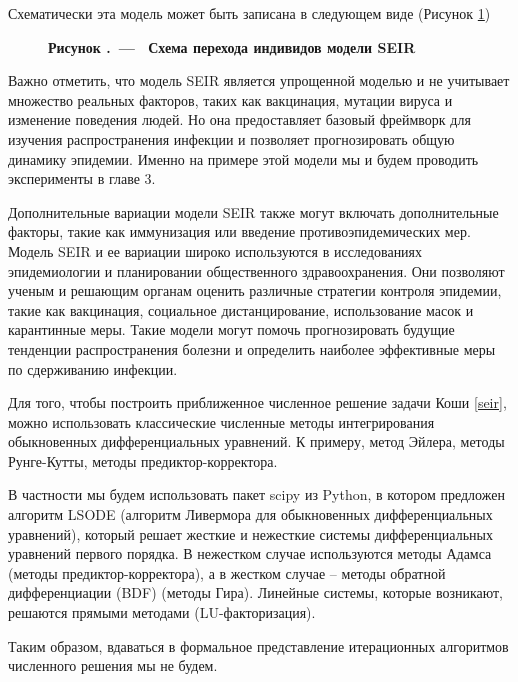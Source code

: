 \documentclass[a4paper, 14pt]{extreport}
\newcounter{figcount}[chapter]
\renewcommand{\thefigcount}{\arabic{chapter}.\arabic{figcount}}
\newcommand{\dfig}[1]%
{\refstepcounter{figcount}\rm \small \bf Рисунок \thefigcount \ --- \  #1}
\begin{document}
	Схематически эта модель может быть записана в следующем виде (Рисунок \ref{fig6})
	\begin{figure}[h!]
		
		\dfig{Схема перехода индивидов модели SEIR}\label{fig6}
	\end{figure}
	
	
	Важно отметить, что модель SEIR является упрощенной моделью и не учитывает множество реальных факторов, таких как вакцинация, мутации вируса и изменение поведения людей. Но она предоставляет базовый фреймворк для изучения распространения инфекции и позволяет прогнозировать общую динамику эпидемии.
	Именно на примере этой модели мы и будем проводить эксперименты в главе 3.
	
	Дополнительные вариации модели SEIR также могут включать дополнительные факторы, такие как иммунизация или введение противоэпидемических мер. Модель SEIR и ее вариации широко используются в исследованиях эпидемиологии и планировании общественного здравоохранения. Они позволяют ученым и решающим органам оценить различные стратегии контроля эпидемии, такие как вакцинация, социальное дистанцирование, использование масок и карантинные меры. Такие модели могут помочь прогнозировать будущие тенденции распространения болезни и определить наиболее эффективные меры по сдерживанию инфекции.
	
	Для того, чтобы построить приближенное численное решение задачи Коши 
	\eqref{seir}, можно использовать классические численные методы интегрирования обыкновенных дифференциальных уравнений. К примеру, метод Эйлера, методы Рунге-Кутты, методы предиктор-корректора.
	
	В частности мы будем использовать пакет scipy из Python, в котором предложен алгоритм LSODE (алгоритм Ливермора для обыкновенных дифференциальных уравнений), который решает жесткие и нежесткие системы дифференциальных уравнений первого порядка. В нежестком случае используются методы Адамса (методы предиктор-корректора), а в жестком случае -- методы обратной дифференциации (BDF) (методы Гира). Линейные системы, которые возникают, решаются прямыми методами (LU-факторизация).
	
	Таким образом, вдаваться в формальное представление итерационных алгоритмов численного решения мы не будем. 
	
\end{document}
